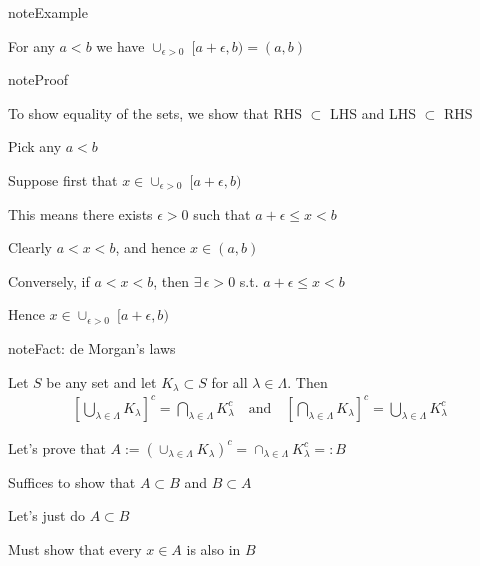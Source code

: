 \documentclass[letterpaper,10pt,english]{jupyterBook}
\begin{document}
\begin{sphinxadmonition}{note}{Example}

\sphinxAtStartPar
For any \(a < b\) we have \(\cup_{\epsilon > 0 } \; [a + \epsilon, b) = (a, b)\)
\end{sphinxadmonition}

\begin{sphinxadmonition}{note}{Proof}

\sphinxAtStartPar
To show equality of the sets, we show that RHS \(\subset\) LHS and LHS \(\subset\) RHS

\sphinxAtStartPar
Pick any \(a < b\)

\sphinxAtStartPar
Suppose first that \(x \in \cup_{\epsilon > 0 } \; [a + \epsilon, b)\)

\sphinxAtStartPar
This means there exists \(\epsilon > 0\) such that \(a + \epsilon \leq x < b\)

\sphinxAtStartPar
Clearly \(a < x < b\), and hence \(x \in (a, b)\)

\sphinxAtStartPar
Conversely, if \(a < x < b\), then \(\exists \, \epsilon > 0\) s.t. \(a +
\epsilon \leq x < b\)

\sphinxAtStartPar
Hence \(x \in \cup_{\epsilon > 0 } \; [a + \epsilon, b)\)
\end{sphinxadmonition}

\begin{sphinxadmonition}{note}{Fact: de Morgan’s laws}

\sphinxAtStartPar
Let \(S\) be any set and let \(K_{\lambda} \subset S\) for all \(\lambda \in \Lambda\). Then
\begin{equation*}
\begin{split}
\left[ \bigcup_{\lambda \in \Lambda} K_{\lambda}  \right]^{c}  =
\bigcap_{\lambda \in \Lambda} K_{\lambda}^{c}
\quad \text{and} \quad
\left[ \bigcap_{\lambda \in \Lambda}
K_{\lambda}  \right]^{c}  = \bigcup_{\lambda \in \Lambda} K_{\lambda}^{c}
\end{split}
\end{equation*}\end{sphinxadmonition}

\sphinxAtStartPar
Let’s prove that \(A := \left( \cup_{\lambda \in \Lambda} K_{\lambda}  \right)^{c}
= \cap_{\lambda \in \Lambda} K_{\lambda}^{c} =: B\)

\sphinxAtStartPar
Suffices to show that \(A \subset B\) and \(B \subset A\)

\sphinxAtStartPar
Let’s just do  \(A \subset B\)

\sphinxAtStartPar
Must show that every \(x \in A\) is also in \(B\)
\end{document}
